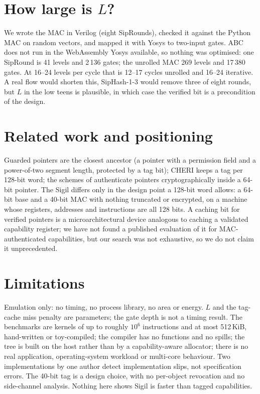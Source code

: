 \documentclass[10pt,twocolumn,a4paper]{article}
\begin{document}
\section{How large is $L$?}\label{sec:L}
We wrote the MAC in Verilog (eight SipRounds), checked it against the Python MAC on random vectors, and mapped it with Yosys to two-input gates. ABC does not run in the WebAssembly Yosys available, so nothing was optimised: one SipRound is 41 levels and 2\,136 gates; the unrolled MAC 269 levels and 17\,380 gates. At 16--24 levels per cycle that is 12--17 cycles unrolled and 16--24 iterative. A real flow would shorten this, SipHash-1-3 would remove three of eight rounds, but $L$ in the low teens is plausible, in which case the verified bit is a precondition of the design.

\section{Related work and positioning}
Guarded pointers \cite{guarded} are the closest ancestor (a pointer with a permission field and a power-of-two segment length, protected by a tag bit); CHERI \cite{cheri,cheriisa} keeps a tag per 128-bit word; the schemes of \cite{intelpat,cthree,sealedptr} authenticate pointers cryptographically inside a 64-bit pointer. The Sigil differs only in the design point a 128-bit word allows: a 64-bit base and a 40-bit MAC with nothing truncated or encrypted, on a machine whose registers, addresses and instructions are all 128 bits. A caching bit for verified pointers is a microarchitectural device analogous to caching a validated capability register; we have not found a published evaluation of it for MAC-authenticated capabilities, but our search was not exhaustive, so we do not claim it unprecedented.

\section{Limitations}
Emulation only: no timing, no process library, no area or energy. $L$ and the tag-cache miss penalty are parameters; the gate depth is not a timing result. The benchmarks are kernels of up to roughly $10^6$ instructions and at most 512\,KiB, hand-written or toy-compiled; the compiler has no functions and no spills; the tree is built on the host rather than by a capability-aware allocator; there is no real application, operating-system workload or multi-core behaviour. Two implementations by one author detect implementation slips, not specification errors. The 40-bit tag is a design choice, with no per-object revocation and no side-channel analysis. Nothing here shows Sigil is faster than tagged capabilities.
\end{document}
